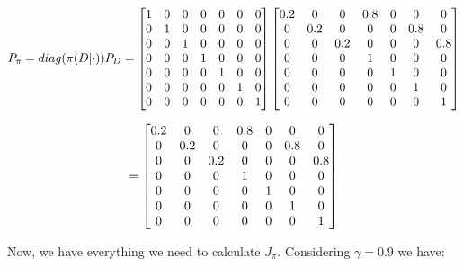 \documentclass{article}
\begin{document}
\begin{equation}
    \notag
    P_{\pi} = diag(\pi(D|\cdot))P_{D} = 
    \begin{bmatrix}
        1 & 0 & 0 & 0 & 0 & 0 & 0 \\
        0 & 1 & 0 & 0 & 0 & 0 & 0 \\
        0 & 0 & 1 & 0 & 0 & 0 & 0 \\
        0 & 0 & 0 & 1 & 0 & 0 & 0 \\
        0 & 0 & 0 & 0 & 1 & 0 & 0 \\
        0 & 0 & 0 & 0 & 0 & 1 & 0 \\
        0 & 0 & 0 & 0 & 0 & 0 & 1 \\
    \end{bmatrix}
    \begin{bmatrix}
        0.2 & 0 & 0 & 0.8 & 0 & 0 & 0 \\
        0 & 0.2 & 0 & 0 & 0 & 0.8 & 0 \\
        0 & 0 & 0.2 & 0 & 0 & 0 & 0.8 \\
        0 & 0 & 0 & 1 & 0 & 0 & 0 \\
        0 & 0 & 0 & 0 & 1 & 0 & 0 \\
        0 & 0 & 0 & 0 & 0 & 1 & 0 \\
        0 & 0 & 0 & 0 & 0 & 0 & 1 \\
    \end{bmatrix}
\end{equation}

\begin{equation}
    \notag
    =
    \begin{bmatrix}
        0.2 & 0 & 0 & 0.8 & 0 & 0 & 0 \\
        0 & 0.2 & 0 & 0 & 0 & 0.8 & 0 \\
        0 & 0 & 0.2 & 0 & 0 & 0 & 0.8 \\
        0 & 0 & 0 & 1 & 0 & 0 & 0 \\
        0 & 0 & 0 & 0 & 1 & 0 & 0 \\
        0 & 0 & 0 & 0 & 0 & 1 & 0 \\
        0 & 0 & 0 & 0 & 0 & 0 & 1 \\
    \end{bmatrix}
\end{equation}
\medskip

Now, we have everything we need to calculate $J_{\pi}$. Considering $\gamma = 0.9$ we have:
\end{document}
